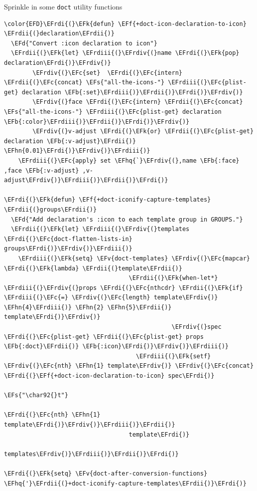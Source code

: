 \documentclass{scrartcl}
\newcommand{\EFk}[1]{\textcolor{EFk}{#1}} %
\newcommand{\EFd}[1]{\textcolor{EFd}{\textit{#1}}} %
\newcommand{\EFs}[1]{\textcolor{EFs}{#1}} %
\newcommand{\EFb}[1]{\textcolor{EFb}{#1}} %
\newcommand{\EFc}[1]{\textcolor{EFc}{#1}} %
\newcommand{\EFv}[1]{\textcolor{EFv}{#1}} %
\newcommand{\EFf}[1]{\textcolor{EFf}{#1}} %
\newcommand{\EFhn}[1]{\textcolor{EFhn}{\textbf{#1}}} %
\newcommand{\EFhq}[1]{\textcolor{EFhq}{#1}} %
\newcommand{\EFrdi}[1]{\textcolor{EFrdi}{#1}} %
\newcommand{\EFrdii}[1]{\textcolor{EFrdii}{#1}} %
\newcommand{\EFrdiii}[1]{\textcolor{EFrdiii}{#1}} %
\newcommand{\EFrdiv}[1]{\textcolor{EFrdiv}{#1}} %
\begin{document}
Sprinkle in some \texttt{doct} utility functions
\begin{Code}
\begin{Verbatim}[]
\color{EFD}\EFrdi{(}\EFk{defun} \EFf{+doct-icon-declaration-to-icon} \EFrdii{(}declaration\EFrdii{)}
  \EFd{"Convert :icon declaration to icon"}
  \EFrdii{(}\EFk{let} \EFrdiii{(}\EFrdiv{(}name \EFrdi{(}\EFk{pop} declaration\EFrdi{)}\EFrdiv{)}
        \EFrdiv{(}\EFc{set}  \EFrdi{(}\EFc{intern} \EFrdii{(}\EFc{concat} \EFs{"all-the-icons-"} \EFrdiii{(}\EFc{plist-get} declaration \EFb{:set}\EFrdiii{)}\EFrdii{)}\EFrdi{)}\EFrdiv{)}
        \EFrdiv{(}face \EFrdi{(}\EFc{intern} \EFrdii{(}\EFc{concat} \EFs{"all-the-icons-"} \EFrdiii{(}\EFc{plist-get} declaration \EFb{:color}\EFrdiii{)}\EFrdii{)}\EFrdi{)}\EFrdiv{)}
        \EFrdiv{(}v-adjust \EFrdi{(}\EFk{or} \EFrdii{(}\EFc{plist-get} declaration \EFb{:v-adjust}\EFrdii{)} \EFhn{0.01}\EFrdi{)}\EFrdiv{)}\EFrdiii{)}
    \EFrdiii{(}\EFc{apply} set \EFhq{`}\EFrdiv{(},name \EFb{:face} ,face \EFb{:v-adjust} ,v-adjust\EFrdiv{)}\EFrdiii{)}\EFrdii{)}\EFrdi{)}

\EFrdi{(}\EFk{defun} \EFf{+doct-iconify-capture-templates} \EFrdii{(}groups\EFrdii{)}
  \EFd{"Add declaration's :icon to each template group in GROUPS."}
  \EFrdii{(}\EFk{let} \EFrdiii{(}\EFrdiv{(}templates \EFrdi{(}\EFc{doct-flatten-lists-in} groups\EFrdi{)}\EFrdiv{)}\EFrdiii{)}
    \EFrdiii{(}\EFk{setq} \EFv{doct-templates} \EFrdiv{(}\EFc{mapcar} \EFrdi{(}\EFk{lambda} \EFrdii{(}template\EFrdii{)}
                                   \EFrdii{(}\EFk{when-let*} \EFrdiii{(}\EFrdiv{(}props \EFrdi{(}\EFc{nthcdr} \EFrdii{(}\EFk{if} \EFrdiii{(}\EFc{=} \EFrdiv{(}\EFc{length} template\EFrdiv{)} \EFhn{4}\EFrdiii{)} \EFhn{2} \EFhn{5}\EFrdii{)} template\EFrdi{)}\EFrdiv{)}
                                               \EFrdiv{(}spec \EFrdi{(}\EFc{plist-get} \EFrdii{(}\EFc{plist-get} props \EFb{:doct}\EFrdii{)} \EFb{:icon}\EFrdi{)}\EFrdiv{)}\EFrdiii{)}
                                     \EFrdiii{(}\EFk{setf} \EFrdiv{(}\EFc{nth} \EFhn{1} template\EFrdiv{)} \EFrdiv{(}\EFc{concat} \EFrdi{(}\EFf{+doct-icon-declaration-to-icon} spec\EFrdi{)}
                                                                    \EFs{"\char92{}t"}
                                                                    \EFrdi{(}\EFc{nth} \EFhn{1} template\EFrdi{)}\EFrdiv{)}\EFrdiii{)}\EFrdii{)}
                                   template\EFrdi{)}
                                 templates\EFrdiv{)}\EFrdiii{)}\EFrdii{)}\EFrdi{)}

\EFrdi{(}\EFk{setq} \EFv{doct-after-conversion-functions} \EFhq{'}\EFrdii{(}+doct-iconify-capture-templates\EFrdii{)}\EFrdi{)}
\end{Verbatim}
\end{Code}
\end{document}
